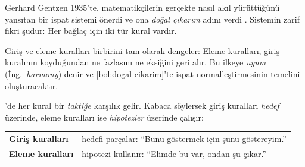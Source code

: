 Gerhard Gentzen 1935'te, matematikçilerin gerçekte nasıl akıl
yürüttüğünü yansıtan bir ispat sistemi önerdi ve ona \emph{doğal çıkarım}
adını verdi \citep{gentzen1935}. Sistemin zarif fikri şudur: Her bağlaç
için iki tür kural vardır.

\begin{center}
\end{center}

Giriş ve eleme kuralları birbirini tam olarak dengeler: Eleme kuralları,
giriş kuralının koyduğundan ne fazlasını ne eksiğini geri alır. Bu ilkeye
\emph{uyum} (İng.\ \emph{harmony}) denir ve \cref{bol:dogal-cikarim}'te
ispat normalleştirmesinin temelini oluşturacaktır.

\Lean{}'de her kural bir \emph{taktiğe} karşılık gelir. Kabaca söylersek
giriş kuralları \emph{hedef} üzerinde, eleme kuralları ise
\emph{hipotezler} üzerinde çalışır:

\begin{onemlifikir}
\begin{tabular}{@{}l@{\quad}l}
\textcolor{ikincil}{\bfseries Giriş kuralları} & hedefi parçalar: ``Bunu göstermek için şunu göstereyim.'' \\[2pt]
\textcolor{vurgu}{\bfseries Eleme kuralları}  & hipotezi kullanır: ``Elimde bu var, ondan şu çıkar.''
\end{tabular}
\end{onemlifikir}

